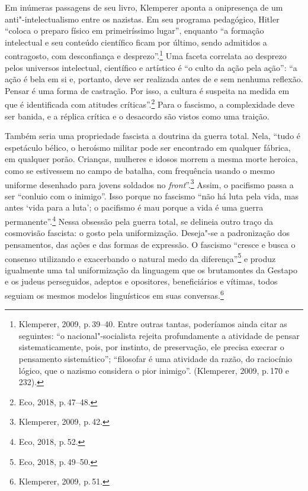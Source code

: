 Em inúmeras passagens de seu livro, Klemperer aponta a onipresença de um
anti"-intelectualismo entre os nazistas. Em seu programa pedagógico,
Hitler ``coloca o preparo físico em primeiríssimo lugar'', enquanto ``a
formação intelectual e seu conteúdo científico ficam por último, sendo
admitidos a contragosto, com desconfiança e desprezo''.\footnote{Klemperer,
  2009, p.\,39--40. Entre outras tantas, poderíamos ainda citar as
  seguintes: ``o nacional"-socialista rejeita profundamente a atividade
  de pensar sistematicamente, pois, por instinto, de preservação, ele
  precisa execrar o pensamento sistemático''; ``filosofar é uma
  atividade da razão, do raciocínio lógico, que o nazismo considera o
  pior inimigo''. (Klemperer, 2009, p.\,170 e 232).} Uma faceta
correlata ao desprezo pelos universos intelectual, científico e
artístico é ``o culto da ação pela ação'': ``a ação é bela em si e,
portanto, deve ser realizada antes de e sem nenhuma reflexão. Pensar é
uma forma de castração. Por isso, a cultura é suspeita na medida em que
é identificada com atitudes críticas''.\footnote{Eco, 2018, p.\,47--48.}
Para o fascismo, a complexidade deve ser banida, e a réplica crítica e o
desacordo são vistos como uma traição.

Também seria uma propriedade fascista a doutrina da guerra total. Nela,
``tudo é espetáculo bélico, o heroísmo militar pode ser encontrado em
qualquer fábrica, em qualquer porão. Crianças, mulheres e idosos morrem
a mesma morte heroica, como se estivessem no campo de batalha, com
frequência usando o mesmo uniforme desenhado para jovens soldados no
\emph{front}''.\footnote{Klemperer, 2009, p.\,42.} Assim, o pacifismo
passa a ser ``conluio com o inimigo''. Isso porque no fascismo ``não há
luta pela vida, mas antes `vida para a luta'; o pacifismo é mau porque a
vida é uma guerra permanente''.\footnote{Eco, 2018, p.\,52.} Nessa
obsessão pela guerra total, se delineia outro traço da cosmovisão
fascista: o gosto pela uniformização. Deseja"-se a padronização dos
pensamentos, das ações e das formas de expressão. O fascismo ``cresce e
busca o consenso utilizando e exacerbando o natural medo da
diferença''\footnote{Eco, 2018, p.\,49--50.} e produz igualmente uma tal
uniformização da linguagem que os brutamontes da Gestapo e os judeus
perseguidos, adeptos e opositores, beneficiários e vítimas, todos
seguiam os mesmos modelos linguísticos em suas conversas.\footnote{Klemperer,
  2009, p.\,51.}

